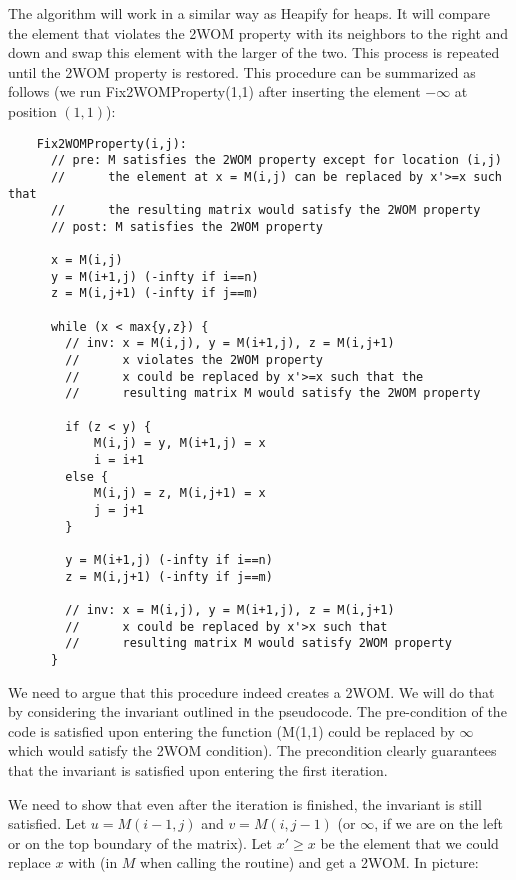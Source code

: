 \begin{enumerate}
\begin{solution}
\begin{itemize}
    The algorithm will work in a similar way as Heapify for heaps.
    It will compare the element that violates the 2WOM property with
    its neighbors to the right and down and swap this element with
    the larger of the two. This process is repeated until the 2WOM
    property is restored. This procedure can be summarized as follows
    (we run Fix2WOMProperty(1,1) after inserting the element $-\infty$
    at position $(1,1)$):

    \begin{verbatim}
    Fix2WOMProperty(i,j):
      // pre: M satisfies the 2WOM property except for location (i,j)
      //      the element at x = M(i,j) can be replaced by x'>=x such that
      //      the resulting matrix would satisfy the 2WOM property
      // post: M satisfies the 2WOM property

      x = M(i,j)
      y = M(i+1,j) (-infty if i==n)
      z = M(i,j+1) (-infty if j==m)
    
      while (x < max{y,z}) {
        // inv: x = M(i,j), y = M(i+1,j), z = M(i,j+1)
        //      x violates the 2WOM property
        //      x could be replaced by x'>=x such that the
        //      resulting matrix M would satisfy the 2WOM property

        if (z < y) {
            M(i,j) = y, M(i+1,j) = x
            i = i+1
        else {
            M(i,j) = z, M(i,j+1) = x
            j = j+1
        }

        y = M(i+1,j) (-infty if i==n)
        z = M(i,j+1) (-infty if j==m)

        // inv: x = M(i,j), y = M(i+1,j), z = M(i,j+1)
        //      x could be replaced by x'>x such that
        //      resulting matrix M would satisfy 2WOM property
      }
    \end{verbatim}

    We need to argue that this procedure indeed creates a 2WOM.  We
    will do that by considering the invariant outlined in the pseudocode.
    The pre-condition of the code is satisfied upon entering the function
    (M(1,1) could be replaced by $\infty$ which would satisfy the 2WOM
    condition).  The precondition clearly guarantees that the
    invariant is satisfied upon entering the first iteration.

    We need to show that even after the iteration is finished, the
    invariant is still satisfied.  Let $u=M(i-1,j)$ and $v=M(i,j-1)$
    (or $\infty$, if we are on the left or on the top boundary of the
    matrix).  Let $x'\geq x$ be the element that we could replace $x$
    with (in $M$ when calling the routine) and get a 2WOM.  In
    picture:


\end{itemize}
\end{solution}
\end{enumerate}

